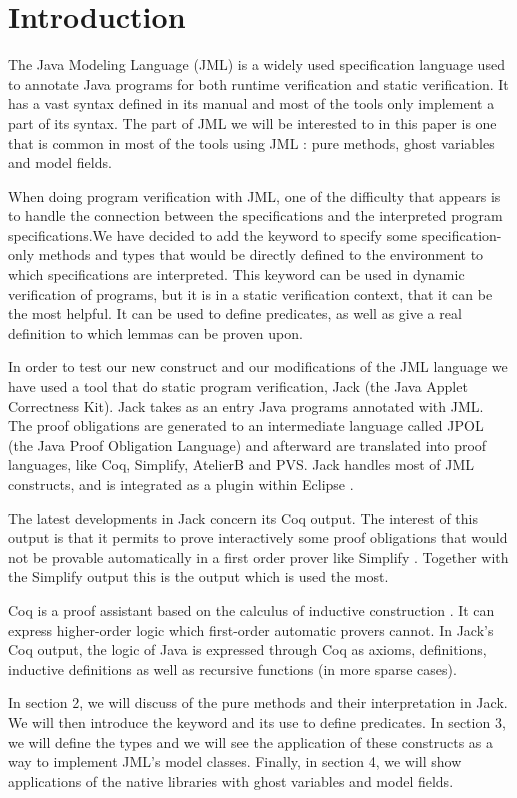 
\section{Introduction}
The Java Modeling Language (JML) is a widely used specification language 
used to annotate Java programs for both runtime verification and static 
verification. It has a vast syntax defined in its manual and most of the 
tools only implement a part of its syntax. The part of JML we will be 
interested to in this paper is one that is common in most of the tools 
using JML \cite{BurdyEtAl05:STTT}: pure methods, ghost variables and  
model fields. 

When doing program verification with JML, one of the difficulty that appears
is to handle the connection between the specifications and the interpreted 
program specifications.We have decided to add the keyword 
to specify some specification-only methods and types that would be 
directly defined to the environment to which specifications are interpreted. 
This keyword can be used in dynamic verification of programs, 
but it is in a static verification context, that it can be the most helpful.
It can be used to define predicates, as well as give a real definition 
to which lemmas can be proven upon.

In order to test our new construct and our modifications of the JML language 
we have used a tool that do static program verification,  Jack 
(the Java Applet Correctness Kit)\cite{BRL-03-JACK,Jack-Web}. 
Jack takes as an entry Java programs annotated with JML. 
The proof obligations are generated to an intermediate language called JPOL 
(the Java Proof Obligation Language) and afterward are translated into 
proof languages, like Coq, Simplify, AtelierB and PVS. 
Jack handles most of JML constructs, and is integrated as a plugin within 
Eclipse \cite{Eclipse-Web}.

The latest developments in Jack concern its Coq output. 
The interest of this output is that it permits to prove interactively some 
proof obligations that would not be provable automatically in a first order 
prover like Simplify \cite{simplify}.
Together with the Simplify output this is the output which is used the most.

Coq is a proof assistant based on the calculus of inductive construction 
\cite{BC-04-COQ}. 
It can express 
higher-order logic which first-order automatic provers cannot. In Jack's Coq 
output, the logic of Java is  expressed through Coq as axioms, definitions, 
inductive definitions as well as recursive 
functions (in more sparse cases).

In section 2,  we will discuss of the pure methods and their interpretation 
in Jack. We will then introduce
the  keyword and its use to define predicates.
In section 3, we will define the  types and we will see the 
application of these constructs 
as a way to implement JML's model classes.
Finally, in section 4, we will show applications of the native libraries with 
 ghost variables and model fields.
